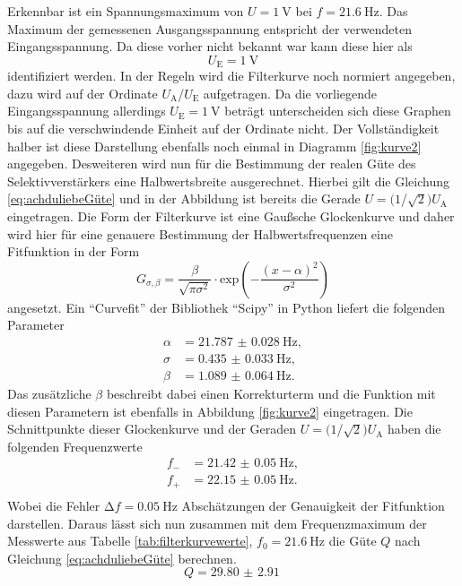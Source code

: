 Erkennbar ist ein Spannungsmaximum von $U = \SI{1}{\volt}$ bei $f = \SI{21.6}{\hertz}$. Das Maximum der gemessenen Ausgangsspannung entspricht der verwendeten Eingangsspannung. Da diese vorher nicht bekannt war kann diese hier als 
\begin{equation*}
U_{\text{E}} = \SI{1}{\volt}
\end{equation*}
identifiziert werden. In der Regeln wird die Filterkurve noch normiert angegeben, dazu wird auf der Ordinate $U_{\text{A}}$/$U_{\text{E}}$ aufgetragen. Da die vorliegende Eingangsspannung allerdings $U_{\text{E}} = \SI{1}{\volt}$ beträgt 
unterscheiden sich diese Graphen bis auf die verschwindende Einheit auf der Ordinate nicht. 
Der Vollständigkeit halber ist diese Darstellung ebenfalls noch einmal in Diagramm \ref{fig:kurve2} angegeben.
Desweiteren wird nun für die Bestimmung der realen Güte des Selektivverstärkers eine Halbwertsbreite ausgerechnet. Hierbei gilt die Gleichung \eqref{eq:achduliebeGüte}
und in der Abbildung ist bereits die Gerade $U = (1$/$\sqrt{2}) U_{\text{A}}$ eingetragen. Die Form der Filterkurve ist eine Gaußsche Glockenkurve und daher wird hier für eine
genauere Bestimmung der Halbwertsfrequenzen eine Fitfunktion in der Form \cite{gauss}
\begin{equation}
G_{\sigma, \beta} =  \frac{\beta}{\sqrt{\pi \sigma^2}} \cdot \text{exp}\left( -\frac{(x- \alpha)^2}{\sigma^2}\right)
\end{equation}
angesetzt.
Ein \enquote{Curvefit} der Bibliothek \enquote{Scipy} \cite{scipy} in Python liefert die folgenden Parameter
\begin{align*}
\alpha &= \SI{21.787(28)}{\hertz},\\ 
\sigma &= \SI{0.435(33)}{\hertz},\\
\beta  &= \SI{1.089(64)}{\hertz}.
\end{align*}
Das zusätzliche $\beta$ beschreibt dabei einen Korrekturterm und die Funktion mit diesen Parametern ist ebenfalls in Abbildung \ref{fig:kurve2} eingetragen. Die Schnittpunkte dieser Glockenkurve und der Geraden $U = (1$/$\sqrt{2}) U_{\text{A}}$ haben die folgenden Frequenzwerte
\begin{align*}
f_{-} &= \SI{21.42(5)}{\hertz},\\
f_{+} &= \SI{22.15(5)}{\hertz}.\\
\end{align*}
Wobei die Fehler $\increment f = \SI{0.05}{\hertz}$ Abschätzungen der Genauigkeit der Fitfunktion darstellen.
Daraus lässt sich nun zusammen mit dem Frequenzmaximum der Messwerte aus Tabelle \ref{tab:filterkurvewerte}, $f_{0} = \SI{21.6}{\hertz}$ die Güte $Q$ nach Gleichung \eqref{eq:achduliebeGüte} berechnen.
\begin{equation}
Q = \SI{29.80(291)}{}
\end{equation}

